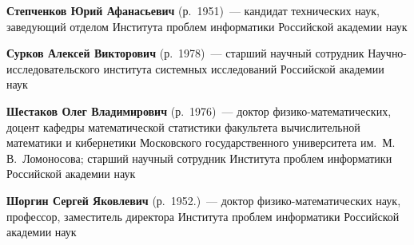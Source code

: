 \begin{multicols}{2}
\noindent
\textbf{Степченков Юрий Афанасьевич} (р.\ 1951)~---
кандидат технических наук, заведующий отделом Института проб\-лем информатики
Российской академии наук

\vspace*{7pt}

\noindent
\textbf{Сурков Алексей Викторович} (р.\ 1978)~--- 
старший научный сотрудник На\-уч\-но-ис\-сле\-до\-ва\-тель\-ско\-го 
института системных исследований Российской академии наук

\vspace*{7pt}

\noindent 
\textbf{Шестаков Олег Владимирович} (р.\ 1976)~--- доктор 
фи\-зи\-ко-ма\-те\-ма\-ти\-че\-ских, доцент кафедры математической статистики 
факультета вычисли\-тельной математики и кибернетики Московского 
государственного университета им.\ М.\,В.~Ломоносова; 
старший научный сотрудник Института проб\-лем информатики
Российской академии наук

\vspace*{7pt}

\noindent 
\textbf{Шоргин Сергей Яковлевич} (р.\ 1952.)~--- доктор
фи\-зи\-ко-ма\-те\-ма\-ти\-че\-ских наук, профессор, заместитель директора Института 
проб\-лем информатики Российской академии наук










 \label{end\stat}










\end{multicols}

\newpage